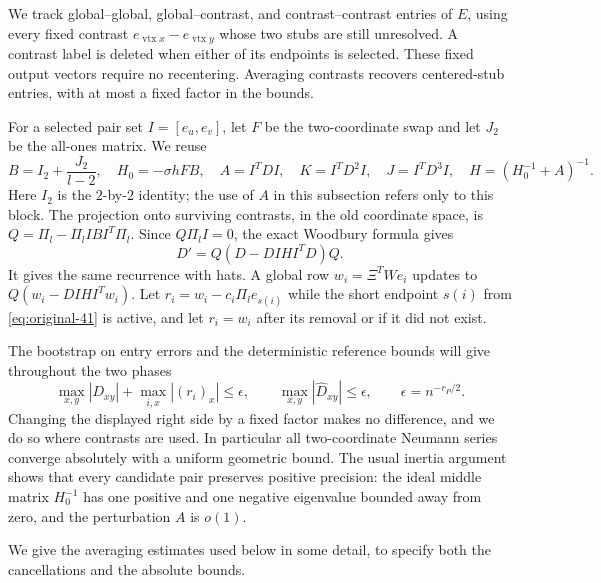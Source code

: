 We track global--global, global--contrast, and contrast--contrast entries
of $E$, using every fixed contrast
$e_{\operatorname{vtx}x}-e_{\operatorname{vtx}y}$ whose two stubs are
still unresolved.  A contrast label is deleted when either of its
endpoints is selected.  These fixed output vectors require no
recentering.  Averaging contrasts recovers centered-stub entries, with
at most a fixed factor in the bounds.

For a selected pair set $I=[e_u,e_v]$, let $F$ be the two-coordinate
swap and let $J_2$ be the all-ones matrix.  We reuse
\[
 B=I_2+\frac{J_2}{l-2},\quad H_0=-\sigma hFB,\quad
 A=I^TDI,\quad K=I^TD^2I,\quad J=I^TD^3I,\quad
 H=(H_0^{-1}+A)^{-1}.
\]
Here $I_2$ is the $2$-by-$2$ identity; the use of $A$ in this
subsection refers only to this block.  The projection onto surviving
contrasts, in the old coordinate space, is
$Q=\Pi_l-\Pi_lIBI^T\Pi_l$.  Since $Q\Pi_lI=0$, the exact
Woodbury formula gives
\begin{equation}
 D'=Q(D-DIHI^TD)Q.
 \label{eq:original-44}
\end{equation}
It gives the same recurrence with hats.  A global row
$w_i=\Xi^TWe_i$ updates to
$Q(w_i-DIHI^Tw_i)$.
Let
$r_i=w_i-c_i\Pi_le_{s(i)}$ while the short endpoint $s(i)$ from
\eqref{eq:original-41} is active, and let $r_i=w_i$ after its removal
or if it did not exist.

The bootstrap on entry errors and the deterministic reference bounds
will give throughout the two phases
\begin{equation}
 \max_{x,y}|D_{xy}|+\max_{i,x}|(r_i)_x|\le\epsilon,
 \qquad \max_{x,y}|\widehat D_{xy}|\le\epsilon,
 \qquad \epsilon=n^{-r_P/2}.
 \label{eq:original-45}
\end{equation}
Changing the displayed right side by a fixed factor makes no
difference, and we do so where contrasts are used.
In particular all two-coordinate Neumann series converge absolutely
with a uniform geometric bound.  The usual inertia argument shows
that every candidate pair preserves positive precision: the ideal
middle matrix $H_0^{-1}$ has one positive and one negative eigenvalue
bounded away from zero, and the perturbation $A$ is $o(1)$.

We give the averaging estimates used below in some detail, to specify
both the cancellations and the absolute bounds.

